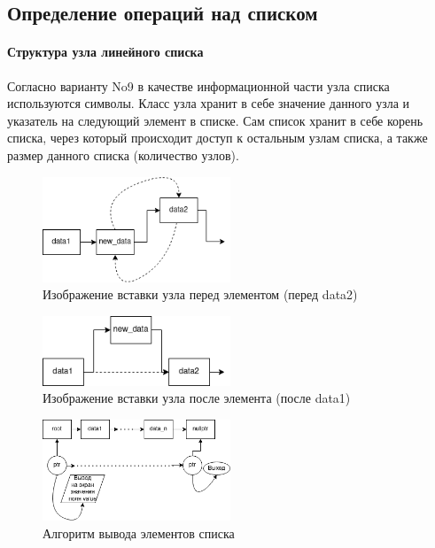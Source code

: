 \documentclass[a4paper, 14pt]{extarticle}
\begin{document}
\subsection{Определение операций над списком}
\paragraph{Структура узла линейного списка}
Согласно варианту No9 в качестве информационной части узла списка
используются символы. Класс узла хранит в себе значение данного узла
и указатель на следующий элемент в списке. Сам список хранит в себе
корень списка, через который происходит доступ к остальным узлам списка,
а также размер данного списка (количество узлов).

\begin{figure}[htpb]
  \centering
  \includegraphics[width=0.5\textwidth]{pictures/insert_before.png}
  \caption{Изображение вставки узла перед элементом (перед data2)}
  \label{fig:insert_before}
\end{figure}

\begin{figure}[htpb]
  \centering
  \includegraphics[width=0.5\textwidth]{pictures/insert_after.png}
  \caption{Изображение вставки узла после элемента (после data1)}
  \label{fig:insert_after}
\end{figure}

\begin{figure}[htpb]
  \centering
  \includegraphics[width=0.5\textwidth]{pictures/print_list.png}
  \caption{Алгоритм вывода элементов списка}
  \label{fig:print_list}
\end{figure}
\end{document}
